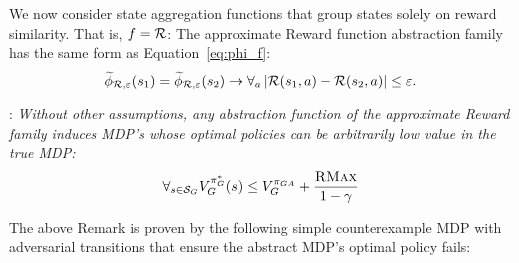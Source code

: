 We now consider state aggregation functions that group states solely on reward similarity. That is, $f = \mathcal{R}$:
The approximate Reward function abstraction family has the same form as Equation~\ref{eq:phi_f}:
\vspace{-1mm}%
\begin{equation}
\widetilde \phi_{\mathcal{R},\varepsilon}(s_1) = \widetilde \phi_{\mathcal{R},\varepsilon}(s_2) \rightarrow \forall_a \left|\mathcal{R}(s_1, a) - \mathcal{R}(s_2, a)\right| \leq \varepsilon.
\end{equation}
\edefn

: {\it Without other assumptions, any abstraction function of the approximate Reward family induces MDP's whose optimal policies can be arbitrarily low value in the true MDP:
\begin{equation}
\forall_{s \in \mathcal{S}_G} V_G^{\pi_G^*}(s) \leq V_G^{\pi_{GA}} + \frac{\textsc{RMax}}{1-\gamma}
\end{equation}} 

The above Remark is proven by the following simple counterexample MDP with adversarial transitions that ensure the abstract MDP's optimal policy fails:


%
%



